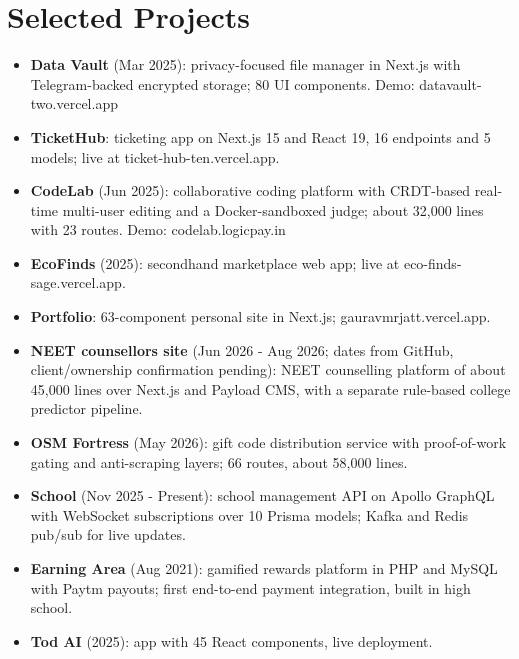 \documentclass[11pt,a4paper,sans]{moderncv}
\begin{document}
\section{Selected Projects}
\vspace{1pt}
\begin{itemize}
    \item {\textbf{Data Vault} (Mar 2025): privacy-focused file manager in Next.js with Telegram-backed encrypted storage; 80 UI components. Demo: datavault-two.vercel.app}
    \item {\textbf{TicketHub}: ticketing app on Next.js 15 and React 19, 16 endpoints and 5 models; live at ticket-hub-ten.vercel.app.}
    \item {\textbf{CodeLab} (Jun 2025): collaborative coding platform with CRDT-based real-time multi-user editing and a Docker-sandboxed judge; about 32,000 lines with 23 routes. Demo: codelab.logicpay.in}
    \item {\textbf{EcoFinds} (2025): secondhand marketplace web app; live at eco-finds-sage.vercel.app.}
    \item {\textbf{Portfolio}: 63-component personal site in Next.js; gauravmrjatt.vercel.app.}
    \item {\textbf{NEET counsellors site} (Jun 2026 - Aug 2026; dates from GitHub, client/ownership confirmation pending): NEET counselling platform of about 45,000 lines over Next.js and Payload CMS, with a separate rule-based college predictor pipeline.}
    \item {\textbf{OSM Fortress} (May 2026): gift code distribution service with proof-of-work gating and anti-scraping layers; 66 routes, about 58,000 lines.}
    \item {\textbf{School} (Nov 2025 - Present): school management API on Apollo GraphQL with WebSocket subscriptions over 10 Prisma models; Kafka and Redis pub/sub for live updates.}
    \item {\textbf{Earning Area} (Aug 2021): gamified rewards platform in PHP and MySQL with Paytm payouts; first end-to-end payment integration, built in high school.}
    \item {\textbf{Tod AI} (2025): app with 45 React components, live deployment.}
\end{itemize}

\end{document}
